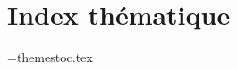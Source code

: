 
\section*{Index thématique}



\begin{multicols}{2}
	\noindent
	
\end{multicols}



\newwrite\themetoc
\immediate\openout\themetoc=themestoc.tex





